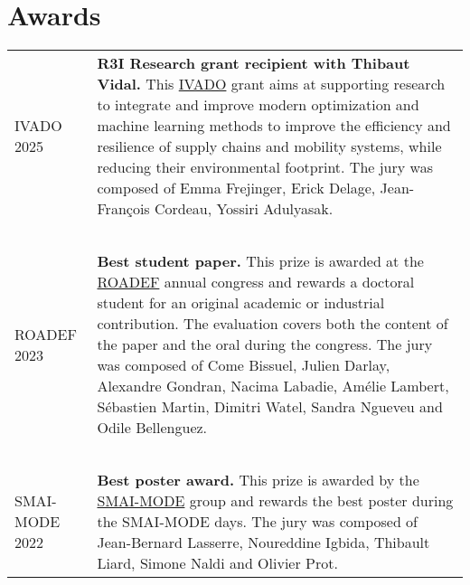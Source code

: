 \section{Awards}

\begin{longtable}[l]{@{}p{}p{}}
    IVADO 2025 & \textbf{R3I Research grant recipient with Thibaut Vidal.} This \href{https://ivado.ca}{IVADO} grant aims at supporting research to integrate and improve modern optimization and machine learning methods to improve the efficiency and resilience of supply chains and mobility systems, while reducing their environmental footprint. The jury was composed of Emma Frejinger, Erick Delage, Jean-François Cordeau, Yossiri Adulyasak. \\~\\
    ROADEF 2023 & \textbf{Best student paper.} This prize is awarded at the \href{https://roadef.org}{ROADEF} annual congress and rewards a doctoral student for an original academic or industrial contribution. The evaluation covers both the content of the paper and the oral during the congress. The jury was composed of Come Bissuel, Julien Darlay, Alexandre Gondran, Nacima Labadie, Amélie Lambert, Sébastien Martin, Dimitri Watel, Sandra Ngueveu and Odile Bellenguez. \\~\\
    SMAI-MODE 2022 & \textbf{Best poster award.} This prize is awarded by the \href{http://smai.emath.fr/}{SMAI-MODE} group and rewards the best poster during the SMAI-MODE days. The jury was composed of Jean-Bernard Lasserre, Noureddine Igbida, Thibault Liard, Simone Naldi and Olivier Prot. \\
\end{longtable}